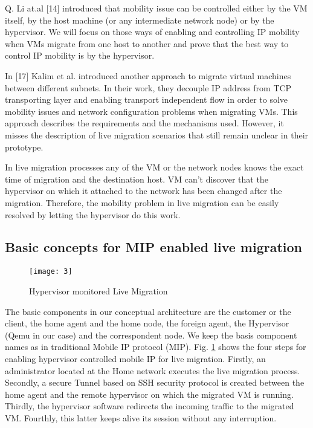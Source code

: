\documentclass[letterpaper,conference]{IEEEtran}
\begin{document}
Q. Li at.al [14] introduced that mobility issue can be controlled either by the VM itself, by the host machine (or any intermediate network node) or by the hypervisor. We will focus on those ways of enabling and controlling IP mobility when VMs migrate from one host to another and prove that the best way to control IP mobility is by the hypervisor.

In [17] Kalim et al. introduced another approach to migrate virtual machines between different subnets. In their work, they decouple IP address from TCP transporting layer and enabling transport independent flow in order to solve mobility issues and network configuration problems when migrating VMs. This approach describes the requirements and the mechanisms used. However, it misses the description of live migration scenarios that still remain unclear in their prototype.

In live migration processes any of the VM or the network nodes knows the exact time of migration and the destination host. VM can’t discover that the hypervisor on which it attached to the network has been changed after the migration. Therefore, the mobility problem in live migration can be easily resolved by letting the hypervisor do this work.

\subsection{Basic concepts for MIP enabled live migration}

\begin{figure}[t]
\centering
\texttt{[image: 3]}
\caption{Hypervisor monitored Live Migration}
\label{3}
\end{figure}

The basic components in our conceptual architecture are the customer or the client, the home agent and the home node, the foreign agent, the Hypervisor (Qemu in our case) and the correspondent node. We keep the basis component names as in traditional Mobile IP protocol (MIP). Fig. \ref{3} shows the four steps for enabling hypervisor controlled mobile IP for live migration. Firstly, an administrator located at the Home network executes the live migration process. Secondly, a secure Tunnel based on SSH security protocol is created between the home agent and the remote hypervisor on which the migrated VM is
running. Thirdly, the hypervisor software redirects the incoming traffic to the migrated VM. Fourthly, this latter keeps alive its session without any interruption.
\end{document}
